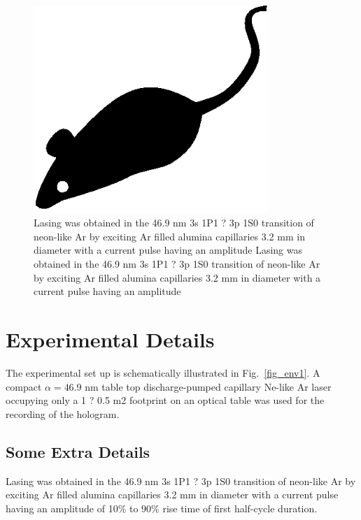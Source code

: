 \documentclass[]{IEEEphot}
\begin{document}
\begin{figure}[t]
\centering%
\includegraphics[width=21pc]{mouse}
\caption{Lasing was obtained in the 46.9 nm 3s 1P1 ? 3p 1S0  transition of neon-like Ar by exciting Ar filled alumina capillaries 3.2 mm in diameter with a current pulse having an amplitude Lasing was obtained in the 46.9 nm 3s 1P1 ? 3p 1S0  transition of neon-like Ar by exciting Ar filled alumina capillaries 3.2 mm in diameter with a current pulse having an amplitude}
\label{fig_env2}\vspace*{-6pt}
\end{figure}

\section{Experimental Details}

 The experimental set up is schematically illustrated in Fig.~\ref{fig_env1}. A compact $\alpha=46.9$ nm table top discharge-pumped capillary Ne-like Ar laser occupying only a 1 ? 0.5 m2 footprint on an optical table was used for the recording of the hologram.    


\subsection{Some Extra Details}

 Lasing was obtained in the 46.9 nm 3s 1P1 ? 3p 1S0  transition of neon-like Ar by exciting Ar filled alumina capillaries 3.2 mm in diameter with a current pulse having an amplitude of 10\% to 90\% rise time of first half-cycle duration.  
\end{document}
